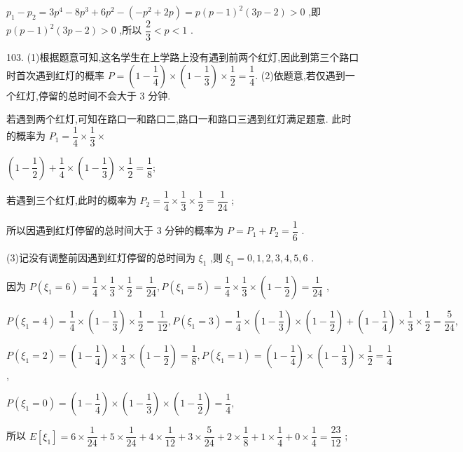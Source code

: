 ${p}_{1} - {p}_{2} = 3{p}^{4} - 8{p}^{3} + 6{p}^{2} - \left( {-{p}^{2} + {2p}}\right)  = p{\left( p - 1\right) }^{2}\left( {{3p} - 2}\right)  > 0$ ,即 $p{\left( p - 1\right) }^{2}\left( {{3p} - 2}\right)  > 0$ ,所以 $\dfrac{2}{3} < p < 1$ .

103. (1)根据题意可知,这名学生在上学路上没有遇到前两个红灯,因此到第三个路口时首次遇到红灯的概率 $P = \left( {1 - \dfrac{1}{4}}\right)  \times  \left( {1 - \dfrac{1}{3}}\right)  \times  \dfrac{1}{2} = \dfrac{1}{4}.$ (2)依题意,若仅遇到一个红灯,停留的总时间不会大于 3 分钟.

若遇到两个红灯,可知在路口一和路口二,路口一和路口三遇到红灯满足题意. 此时的概率为 ${P}_{1} = \dfrac{1}{4} \times  \dfrac{1}{3} \times$

$\left( {1 - \dfrac{1}{2}}\right)  + \dfrac{1}{4} \times  \left( {1 - \dfrac{1}{3}}\right)  \times  \dfrac{1}{2} = \dfrac{1}{8};$

若遇到三个红灯,此时的概率为 ${P}_{2} = \dfrac{1}{4} \times  \dfrac{1}{3} \times  \dfrac{1}{2} = \dfrac{1}{24}$ ;

所以因遇到红灯停留的总时间大于 3 分钟的概率为 $P = {P}_{1} + {P}_{2} = \dfrac{1}{6}$ .

(3)记没有调整前因遇到红灯停留的总时间为 ${\xi }_{1}$ ,则 ${\xi }_{1} = 0,1,2,3,4,5,6$ .

因为 $P\left( {{\xi }_{1} = 6}\right)  = \dfrac{1}{4} \times  \dfrac{1}{3} \times  \dfrac{1}{2} = \dfrac{1}{24},P\left( {{\xi }_{1} = 5}\right)  = \dfrac{1}{4} \times  \dfrac{1}{3} \times  \left( {1 - \dfrac{1}{2}}\right)  = \dfrac{1}{24}$ ,

$P\left( {{\xi }_{1} = 4}\right)  = \dfrac{1}{4} \times  \left( {1 - \dfrac{1}{3}}\right)  \times  \dfrac{1}{2} = \dfrac{1}{12},P\left( {{\xi }_{1} = 3}\right)  = \dfrac{1}{4} \times  \left( {1 - \dfrac{1}{3}}\right)  \times  \left( {1 - \dfrac{1}{2}}\right)  + \left( {1 - \dfrac{1}{4}}\right)  \times  \dfrac{1}{3} \times  \dfrac{1}{2} = \dfrac{5}{24},$

$P\left( {{\xi }_{1} = 2}\right)  = \left( {1 - \dfrac{1}{4}}\right)  \times  \dfrac{1}{3} \times  \left( {1 - \dfrac{1}{2}}\right)  = \dfrac{1}{8},P\left( {{\xi }_{1} = 1}\right)  = \left( {1 - \dfrac{1}{4}}\right)  \times  \left( {1 - \dfrac{1}{3}}\right)  \times  \dfrac{1}{2} = \dfrac{1}{4}$ ,

$P\left( {{\xi }_{1} = 0}\right)  = \left( {1 - \dfrac{1}{4}}\right)  \times  \left( {1 - \dfrac{1}{3}}\right)  \times  \left( {1 - \dfrac{1}{2}}\right)  = \dfrac{1}{4},$

所以 $E\left\lbrack  {\xi }_{1}\right\rbrack   = 6 \times  \dfrac{1}{24} + 5 \times  \dfrac{1}{24} + 4 \times  \dfrac{1}{12} + 3 \times  \dfrac{5}{24} + 2 \times  \dfrac{1}{8} + 1 \times  \dfrac{1}{4} + 0 \times  \dfrac{1}{4} = \dfrac{23}{12}$ ;

